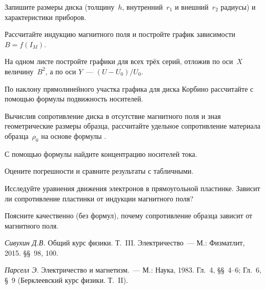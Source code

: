 \begin{lab:task}
\item{ Запишите размеры диска (толщину~$h$, внутренний~$r_1$  и внешний~$r_2$
радиусы) и характеристики приборов.}


\item { Рассчитайте индукцию магнитного поля и постройте график зависимости
$B=f(I_{M})$.}

\item { На одном листе постройте графики для всех трёх серий, отложив по оси~$X$
величину~$B^2$, а по оси $Y$~--- $(U-U_0)/U_0$.}

\item { По наклону прямолинейного участка графика для диска Корбино рассчитайте
с помощью формулы  подвижность носителей.}

\item { Вычислив сопротивление диска в отсутствие магнитного поля и зная
геометрические размеры образца, рассчитайте удельное сопротивление материала
образца~$\rho_0$ на основе формулы .}

\item {С помощью формулы  найдите концентрацию носителей
тока.}

\item { Оцените погрешности и сравните результаты с табличными.}
\end{lab:task}


\begin{lab:questions}

\item{ Исследуйте уравнения движения электронов в прямоугольной пластинке.
Зависит ли сопротивление пластинки от индукции магнитного поля?}

\item{ Поясните качественно (без формул), почему сопротивление образца зависит
от магнитного поля.}
\end{lab:questions}


\begin{lab:literature}
\item{ \emph{Сивухин Д.В.} Общий курс физики. Т.~III. Электричество~--- М.:
Физматлит, 2015. \S\S~98, 100.}
\item{ \emph{Парселл Э.} Электричество и магнетизм.~--- М.: Наука, 1983. Гл.~4,
\S\S~4--6; Гл.~6, \S~9 (Берклеевский курс физики. Т.~II).}
\end{lab:literature}

